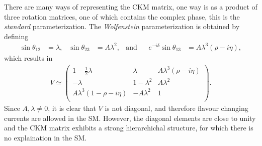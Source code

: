 There are many ways of representing the CKM matrix, one way is as a product of three rotation
matrices, one of which contains the complex phase, this is the \emph{standard} parameterization.
The \emph{Wolfenstein} parameterization is obtained by defining
\begin{align}
  \sin\theta_{12}&=\lambda,
  & \sin\theta_{23}&=A\lambda^2,
  & \mathrm{and}&
  & e^{-i\delta}\sin\theta_{13} &= A\lambda^3(\rho-i\eta),
\end{align}
which results in
\begin{align}
  V\simeq
    \begin{pmatrix}
      1-\tfrac12\lambda & \lambda & A\lambda^3(\rho-i\eta) \\
      -\lambda & 1-\lambda^2 & A\lambda^2 \\
      A\lambda^3(1-\rho-i\eta) & -A\lambda^2 & 1 \\
    \end{pmatrix}.
  \label{eq:th:wolfenstein}
\end{align}
Since $A,\lambda\neq0$, it is clear that $V$ is not diagonal, and therefore flavour changing
currents are allowed in the SM.
However, the diagonal elements are close to unity and the CKM matrix exhibits a strong
hierarchichal structure, for which there is no explaination in the SM.




